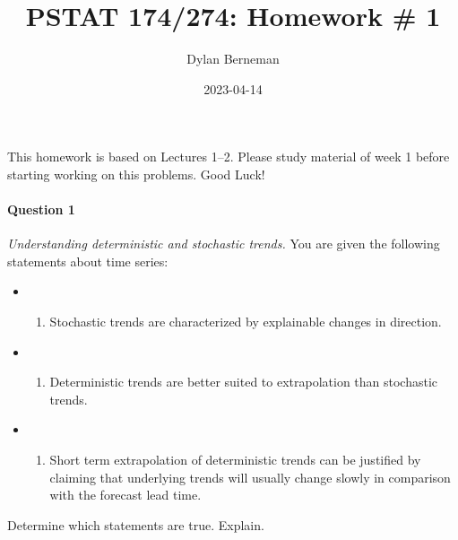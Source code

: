 \documentclass[
]{article}
\title{PSTAT 174/274: Homework \# 1}
\author{Dylan Berneman}
\date{2023-04-14}
\providecommand{\tightlist}{%
  \setlength{\itemsep}{0pt}\setlength{\parskip}{0pt}}
\begin{document}
\maketitle

This homework is based on Lectures 1--2. Please study material of week 1
before starting working on this problems. Good Luck!

\hypertarget{question-1}{%
\paragraph{Question 1}\label{question-1}}

\emph{Understanding deterministic and stochastic trends.} You are given
the following statements about time series:

\setlength{\leftskip}{2cm}

\begin{itemize}
\item
  \begin{enumerate}
  \def\labelenumi{\Roman{enumi}.}
  \tightlist
  \item
    Stochastic trends are characterized by explainable changes in
    direction.\\
  \end{enumerate}
\item
  \begin{enumerate}
  \def\labelenumi{\Roman{enumi}.}
  \setcounter{enumi}{1}
  \tightlist
  \item
    Deterministic trends are better suited to extrapolation than
    stochastic trends.\\
  \end{enumerate}
\item
  \begin{enumerate}
  \def\labelenumi{\Roman{enumi}.}
  \setcounter{enumi}{2}
  \tightlist
  \item
    Short term extrapolation of deterministic trends can be justified by
    claiming that underlying trends will usually change slowly in
    comparison with the forecast lead time.
  \end{enumerate}
\end{itemize}

\setlength{\leftskip}{0cm}

Determine which statements are true. Explain.\\

\setlength{\leftskip}{2cm}
\end{document}
